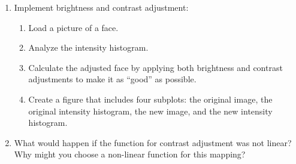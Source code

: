 \begin{prob}
\begin{enumerate}
 \item Implement brightness and contrast adjustment:
 \begin{enumerate}
 \item Load a picture of a face.
 \item Analyze the intensity histogram.
 \item Calculate the adjusted face by applying both brightness and contrast adjustments to make it as ``good'' as possible.
 \item Create a figure that includes four subplots: the original image, the original intensity histogram, the new image, and the new intensity histogram.
 \end{enumerate}
 \item What would happen if the function for contrast adjustment was not linear?  Why might you choose a non-linear function for this mapping?
 \end{enumerate}
\end{prob}

\pagebreak
\shipoutAnswer
